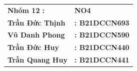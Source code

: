 \begin{center}
\begin{tabular}{ll}
{\textbf{\large{Nhóm 12 :}}}  & {\textbf{\large{NO4}}} \\
{\textbf{\large{Trần Đức Thịnh}}} & {\textbf{\large{: B21DCCN693}}}  \\
{\textbf{\large{Vũ Danh Phong}}} & {\textbf{\large{: B21DCCN590}}}  \\
{\textbf{\large{Trần Đức Huy}}} & {\textbf{\large{: B21DCCN440}}}  \\
{\textbf{\large{Trần Quang Huy}}} & {\textbf{\large{: B21DCCN441}}}  \\


\end{tabular}


\end{center}